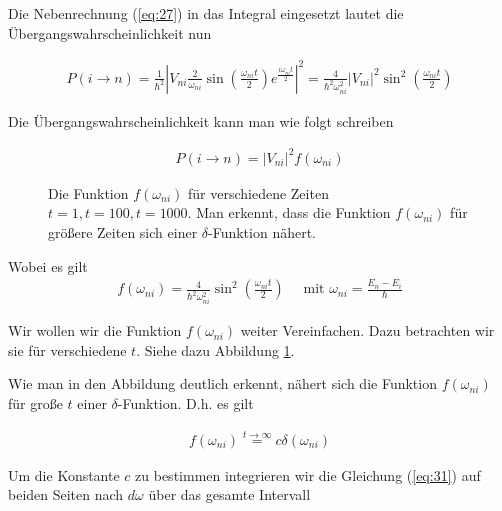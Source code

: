 Die Nebenrechnung (\ref{eq:27}) in das Integral eingesetzt lautet die Übergangswahrscheinlichkeit nun

\begin{align}
  \label{eq:28}
  P(i\rightarrow n) = \frac{1}{\hbar^2} \left| V_{ni}\frac{2}{\omega_{ni}}\sin(\frac{\omega_{ni} t}{2})e^{\frac{i\omega_{ni} t}{2}} \right|^2 = \frac{4}{\hbar^2\omega_{ni}^2}|V_{ni}|^2\sin^2(\frac{\omega_{ni} t}{2})
\end{align}

Die Übergangswahrscheinlichkeit kann man wie folgt schreiben

\begin{align}
  \label{eq:29}
   P(i\rightarrow n) = |V_{ni}|^2 f(\omega_{ni}) 
\end{align}
\begin{figure}[!thb]
\begin{minipage}{1.0\linewidth}
  
  \centering
  
  
 
 \caption{Die Funktion  \(f(\omega_{ni}) \) für verschiedene Zeiten \(t=1, t=100, t=1000\).  Man erkennt, dass die Funktion \(f(\omega_{ni})\) für größere Zeiten sich einer \(\delta\)-Funktion nähert. }
 \label{fig:1}

\end{minipage}
\end{figure}

Wobei es gilt 
\begin{align}
  \label{eq:30}
  f(\omega_{ni})= \frac{4}{\hbar^2\omega_{ni}^2}\sin^2(\frac{\omega_{ni} t}{2}) \quad \text{ mit } \omega_{ni}=\frac{E_n-E_i}{\hbar}
\end{align}

Wir wollen wir die Funktion \(f(\omega_{ni}) \) weiter Vereinfachen. Dazu betrachten wir sie für verschiedene \(t\). Siehe dazu Abbildung \ref{fig:1}.

Wie man in den Abbildung deutlich erkennt, nähert sich die Funktion \(f(\omega_{ni})\) für große \(t\) einer \(\delta\)-Funktion. D.h. es gilt

\begin{align}
  \label{eq:31}
  f(\omega_{ni}) \stackrel{t \to \infty}= c \delta(\omega_{ni})
\end{align}

Um die Konstante \(c\) zu bestimmen integrieren wir die Gleichung (\ref{eq:31}) auf beiden Seiten nach \(d\omega\) über das gesamte Intervall


